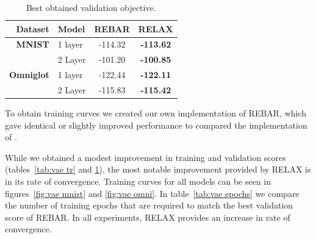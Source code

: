 \documentclass{article}
\newcommand{\E}{\mathbb{E}}
\newcommand{\PT}{\frac{\partial}{\partial \theta}}
\newcommand{\PP}[1]{\frac{\partial}{\partial #1}}
\newcommand{\RELAX}{{\textnormal{RELAX}}}
\begin{document}
\begin{table}[h]
\centering
\begin{tabular}{r l | c c} 
  Dataset & Model & REBAR & RELAX \\\midrule
\textbf{MNIST} & 1 layer  & -114.32 & \textbf{-113.62} \\ 
& 2 Layer  & -101.20 & \textbf{-100.85} \\ \midrule
\textbf{Omniglot} & 1 layer & -122.44 & \textbf{-122.11} \\ 
& 2 Layer & -115.83 & \textbf{-115.42}
\end{tabular}
\caption{Best obtained validation objective.}
\label{tab:vae val}
\end{table}


To obtain training curves we created our own implementation of REBAR, which gave identical or slightly improved performance to compared the implementation of \citet{tucker2017rebar}.

While we obtained a modest improvement in training and validation scores (tables~\ref{tab:vae tr} and \ref{tab:vae val}), the most notable improvement provided by \RELAX{} is in its rate of convergence.
Training curves for all models can be seen in figures~\ref{fig:vae mnist} and \ref{fig:vae omni}.
In table~\ref{tab:vae epochs} we compare the number of training epochs that are required to match the best validation score of REBAR.
In all experiments, RELAX provides an increase in rate of convergence. 
\end{document}
